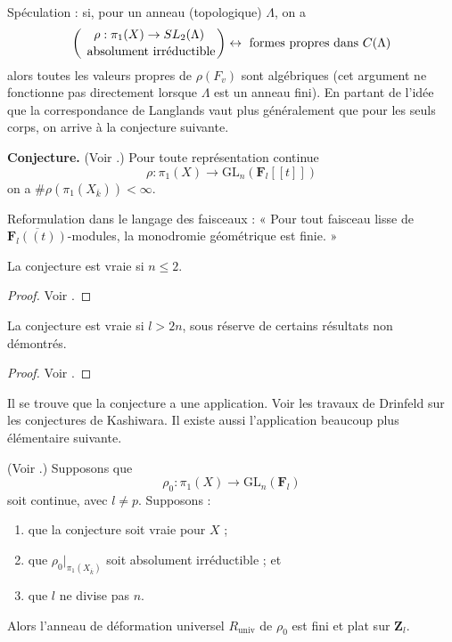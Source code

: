 \noindent
Spéculation : si, pour un anneau (topologique) $\Lambda$, on a
$$
\left(
{\rho : \pi_1(X)\to SL_2(\Lambda) \atop \text{ absolument irréductible}}
\right)
\leftrightarrow
\text{ formes propres dans } C(\Lambda)
$$
alors toutes les valeurs propres de $\rho(F_v)$ sont algébriques (cet argument ne fonctionne
pas directement lorsque $\Lambda$ est un anneau fini). En partant de l'idée que la
correspondance de Langlands vaut plus généralement que pour les seuls corps,
on arrive à la conjecture suivante.

\medskip\noindent
{\bf Conjecture.}
(Voir \cite{dJ-conjecture}.)
Pour toute représentation continue
$$
\rho : \pi_1(X)\to \text{GL}_n(\mathbf{F}_l[[t]])
$$
on a $\# \rho(\pi_1(X_{\overline{k}}))<\infty$.

\medskip\noindent
Reformulation dans le langage des faisceaux :
« Pour tout faisceau lisse de $\overline{\mathbf{F}_l((t))}$-modules, la monodromie
géométrique est finie. »

\begin{theorem}
\label{theorem-conjecture-n-2}
La conjecture est vraie si $n\leq 2$.
\end{theorem}

\begin{proof}
Voir \cite{dJ-conjecture}.
\end{proof}

\begin{theorem}
\label{theorem-conjecture-l-bigger-2n}
La conjecture est vraie si $l > 2n$, sous réserve de certains résultats non démontrés.
\end{theorem}

\begin{proof}
Voir \cite{Gaitsgory}.
\end{proof}

\noindent
Il se trouve que la conjecture a une application.
Voir les travaux de Drinfeld sur les conjectures de Kashiwara. Il existe aussi
l'application beaucoup plus élémentaire suivante.

\begin{theorem}
\label{theorem-deformation-rings}
(Voir \cite[Théorème 3.5]{dJ-conjecture}.)
Supposons que
$$
\rho_0: \pi_1(X)\to \text{GL}_n(\mathbf{F}_l)
$$
soit continue, avec $l\neq p$. Supposons :
\begin{enumerate}
\item que la conjecture soit vraie pour $X$ ;
\item que $\rho_0 |_{\pi_1(X_{\overline{k}})}$ soit absolument irréductible ; et
\item que $l$ ne divise pas $n$.
\end{enumerate}
Alors l'anneau de déformation universel $R_{\text{univ}}$ de $\rho_0$ est
fini et plat sur $\mathbf{Z}_l$.
\end{theorem}

